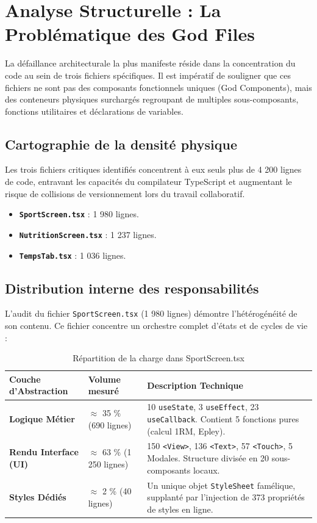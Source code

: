 \documentclass[11pt, a4paper]{article}
\begin{document}
\section{Analyse Structurelle : La Problématique des God Files}

La défaillance architecturale la plus manifeste réside dans la concentration du code au sein de trois fichiers spécifiques. Il est impératif de souligner que ces fichiers ne sont pas des composants fonctionnels uniques (God Components), mais des conteneurs physiques surchargés regroupant de multiples sous-composants, fonctions utilitaires et déclarations de variables.

\subsection{Cartographie de la densité physique}
Les trois fichiers critiques identifiés concentrent à eux seuls plus de 4 200 lignes de code, entravant les capacités du compilateur TypeScript et augmentant le risque de collisions de versionnement lors du travail collaboratif.

\begin{itemize}
    \item \textbf{\texttt{SportScreen.tsx}} : 1 980 lignes.
    \item \textbf{\texttt{NutritionScreen.tsx}} : 1 237 lignes.
    \item \textbf{\texttt{TempsTab.tsx}} : 1 036 lignes.
\end{itemize}

\subsection{Distribution interne des responsabilités}
L'audit du fichier \texttt{SportScreen.tsx} (1 980 lignes) démontre l'hétérogénéité de son contenu. Ce fichier concentre un orchestre complet d'états et de cycles de vie :

\begin{table}[htbp]
\centering
\caption{Répartition de la charge dans SportScreen.tsx}
\label{tab:sportscreen_ratios}
\begin{tabularx}{\textwidth}{@{}lXl@{}}
\toprule
\textbf{Couche d'Abstraction} & \textbf{Volume mesuré} & \textbf{Description Technique} \\ \midrule
\textbf{Logique Métier} & $\approx$ 35 \% (690 lignes) & 10 \texttt{useState}, 3 \texttt{useEffect}, 23 \texttt{useCallback}. Contient 5 fonctions pures (calcul 1RM, Epley). \\
\textbf{Rendu Interface (UI)} & $\approx$ 63 \% (1 250 lignes) & 150 \texttt{<View>}, 136 \texttt{<Text>}, 57 \texttt{<Touch>}, 5 Modales. Structure divisée en 20 sous-composants locaux. \\
\textbf{Styles Dédiés} & $\approx$ 2 \% (40 lignes) & Un unique objet \texttt{StyleSheet} famélique, supplanté par l'injection de 373 propriétés de styles en ligne. \\ \bottomrule
\end{tabularx}
\end{table}
\end{document}
